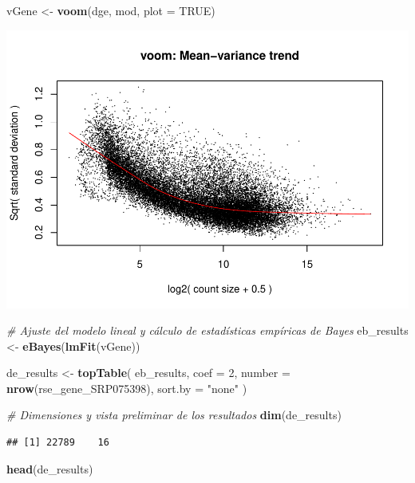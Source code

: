 \documentclass[
]{article}
\newenvironment{Shaded}{\begin{snugshade}}{\end{snugshade}}
\newcommand{\AttributeTok}[1]{\textcolor[rgb]{0.13,0.29,0.53}{#1}}
\newcommand{\CommentTok}[1]{\textcolor[rgb]{0.56,0.35,0.01}{\textit{#1}}}
\newcommand{\ConstantTok}[1]{\textcolor[rgb]{0.56,0.35,0.01}{#1}}
\newcommand{\DecValTok}[1]{\textcolor[rgb]{0.00,0.00,0.81}{#1}}
\newcommand{\FunctionTok}[1]{\textcolor[rgb]{0.13,0.29,0.53}{\textbf{#1}}}
\newcommand{\NormalTok}[1]{#1}
\newcommand{\OtherTok}[1]{\textcolor[rgb]{0.56,0.35,0.01}{#1}}
\newcommand{\StringTok}[1]{\textcolor[rgb]{0.31,0.60,0.02}{#1}}
\begin{document}
\begin{Shaded}
\begin{Highlighting}[]
\NormalTok{vGene }\OtherTok{\textless{}{-}} \FunctionTok{voom}\NormalTok{(dge, mod, }\AttributeTok{plot =} \ConstantTok{TRUE}\NormalTok{)}
\end{Highlighting}
\end{Shaded}

\includegraphics{Proyecto_RNAseq_files/figure-latex/unnamed-chunk-12-1.pdf}

\begin{Shaded}
\begin{Highlighting}[]
\CommentTok{\# Ajuste del modelo lineal y cálculo de estadísticas empíricas de Bayes}
\NormalTok{eb\_results }\OtherTok{\textless{}{-}} \FunctionTok{eBayes}\NormalTok{(}\FunctionTok{lmFit}\NormalTok{(vGene))}

\NormalTok{de\_results }\OtherTok{\textless{}{-}} \FunctionTok{topTable}\NormalTok{(}
\NormalTok{    eb\_results,}
    \AttributeTok{coef =} \DecValTok{2}\NormalTok{,}
    \AttributeTok{number =} \FunctionTok{nrow}\NormalTok{(rse\_gene\_SRP075398),}
    \AttributeTok{sort.by =} \StringTok{"none"}
\NormalTok{)}

\CommentTok{\# Dimensiones y vista preliminar de los resultados}
\FunctionTok{dim}\NormalTok{(de\_results)}
\end{Highlighting}
\end{Shaded}

\begin{verbatim}
## [1] 22789    16
\end{verbatim}

\begin{Shaded}
\begin{Highlighting}[]
\FunctionTok{head}\NormalTok{(de\_results)}
\end{Highlighting}
\end{Shaded}
\end{document}

